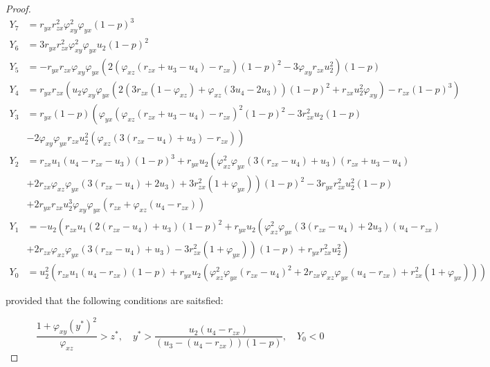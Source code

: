 \begin{proof}
    \begin{align*}
        Y_7 &= r_{yx}r_{zx}^2\varphi_{xy}^2\varphi_{yx}\left(1-p\right)^3\\
        Y_6 &= 3r_{yx}r_{zx}^2\varphi_{xy}^2\varphi_{yx}u_2\left(1-p\right)^2\\
        Y_5 &= -r_{yx}r_{zx}\varphi_{xy}\varphi_{yx}\left(2\left(\varphi_{xz}\left(r_{zx}+u_3-u_4\right)-r_{zx}\right)\left(1-p\right)^2-3\varphi_{xy}r_{zx}u_2^2\right)\left(1-p\right)\\
        Y_4 &= r_{yx}r_{zx}\left(u_2\varphi_{xy}\varphi_{yx}\left(2\left(3r_{zx}\left(1-\varphi_{xz}\right)+\varphi_{xz}\left(3u_4-2u_3\right)\right)\left(1-p\right)^2+r_{zx}u_2^2\varphi_{xy}\right)-r_{zx}\left(1-p\right)^3\right)\\
        Y_3 &= r_{yx}\left(1-p\right)\left(\varphi_{yx}\left(\varphi_{xz}\left(r_{zx}+u_3-u_4\right)-r_{zx}\right)^2\left(1-p\right)^2-3r_{zx}^2u_2\left(1-p\right)\right.\\
            &\left.-2\varphi_{xy}\varphi_{yx}r_{zx}u_2^2\left(\varphi_{xz}\left(3\left(r_{zx}-u_4\right)+u_3\right)-r_{zx}\right)\right)\\
        Y_2 &= r_{zx}u_1\left(u_4-r_{zx}-u_3\right)\left(1-p\right)^3+r_{yx}u_2\left(\varphi_{xz}^2\varphi_{yx}\left(3\left(r_{zx}-u_4\right)+u_3\right)\left(r_{zx}+u_3-u_4\right)\right.\\
            &\left.+2r_{zx}\varphi_{xz}\varphi_{yx}\left(3\left(r_{zx}-u_4\right)+2u_3\right)+3r_{zx}^2\left(1+\varphi_{yx}\right)\right)\left(1-p\right)^2-3r_{yx}r_{zx}^2u_2^2\left(1-p\right)\\
            &+2r_{yx}r_{zx}u_2^3\varphi_{xy}\varphi_{yx}\left(r_{zx}+\varphi_{xz}\left(u_4-r_{zx}\right)\right)\\
        Y_1 &= -u_2\left(r_{zx}u_1\left(2\left(r_{zx}-u_4\right)+u_3\right)\left(1-p\right)^2+r_{yx}u_2\left(\varphi_{xz}^2\varphi_{yx}\left(3\left(r_{zx}-u_4\right)+2u_3\right)\left(u_4-r_{zx}\right)\right.\right.\\
            &\left.\left.+2r_{zx}\varphi_{xz}\varphi_{yx}\left(3\left(r_{zx}-u_4\right)+u_3\right)-3r_{zx}^2\left(1+\varphi_{yx}\right)\right)\left(1-p\right)+r_{yx}r_{zx}^2u_2^2\right)\\
        Y_0 &= u_2^2\left(r_{zx}u_1\left(u_4-r_{zx}\right)\left(1-p\right)+r_{yx}u_2\left(\varphi_{xz}^2\varphi_{yx}\left(r_{zx}-u_4\right)^2+2r_{zx}\varphi_{xz}\varphi_{yx}\left(u_4-r_{zx}\right)+r_{zx}^2\left(1+\varphi_{yx}\right)\right)\right)
    \end{align*}

    provided that the following conditions are saitsfied:
    
    \begin{equation*}
        \frac{1+\varphi_{xy}\left(y^*\right)^2}{\varphi_{xz}}>z^*,\quad y^*>\frac{u_2\left(u_4-r_{zx}\right)}{\left(u_3-\left(u_4-r_{zx}\right)\right)\left(1-p\right)},\quad Y_0<0
    \end{equation*}
\end{proof}

